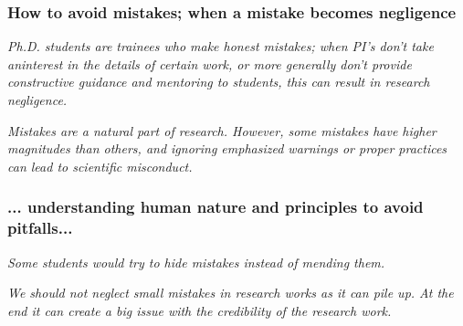 \documentclass{beamer}
\begin{document}
\begin{frame} %
\frametitle{  How to avoid mistakes; when a mistake becomes negligence}

{  \it Ph.D. students are trainees who make honest mistakes; when PI’s don’t take aninterest in the details of certain work, or more generally don’t provide constructive guidance and mentoring to students, this can result in research negligence.}

\medskip

{\it   Mistakes  are  a  natural  part  of  research.   However,  some  mistakes  have  higher magnitudes than others,  and ignoring emphasized warnings or proper practices can lead to scientific misconduct.}


\end{frame}
\begin{frame}
\frametitle{... understanding human nature and principles to avoid pitfalls...}

\medskip

{\it Some students would try to hide mistakes instead of mending them.}

\medskip

{\it We should not neglect small mistakes in research works as it can pile up.  At the end it can create a big issue with the credibility of the research work.}


\end{frame}



 
 

\end{document}
